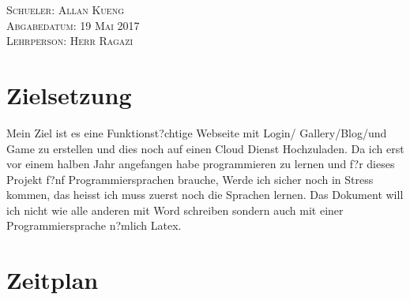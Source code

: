 \documentclass{article}
\renewcommand{\footrulewidth}{0pt}
\begin{document}
\begin{titlepage}
\begin{center}
    \end{center}
    \begin{flushright}
    \textsc{
    \large Schueler: Allan Kueng\\
    Abgabedatum: 19 Mai 2017 \\
    Lehrperson: Herr Ragazi\\
    }
    \end{flushright}
\end{titlepage}




\renewcommand{\contentsname}{Inhaltsverzeichnis}
\tableofcontents
\thispagestyle{}%
\renewcommand{\footrulewidth}{3pt}
\cleardoublepage




\listoffigures
{}
\cleardoublepage



\section*{Zielsetzung}
Mein Ziel ist es eine Funktionst?chtige Webseite mit Login/ Gallery/Blog/und Game zu erstellen und dies noch auf einen Cloud Dienst Hochzuladen.
Da ich erst vor einem halben Jahr angefangen habe programmieren zu lernen und f?r dieses Projekt f?nf Programmiersprachen brauche,
Werde ich sicher noch in Stress kommen, das heisst ich muss zuerst noch die Sprachen lernen.
Das Dokument will ich nicht wie alle anderen mit Word schreiben sondern auch mit einer Programmiersprache n?mlich Latex.
\cleardoublepage



\setcounter{page}{1}%





\section{Zeitplan}
\end{document}
